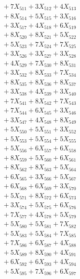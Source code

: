 \documentclass[a4paper,10pt]{article}
\begin{document}
{\begin{align}
&\;  + 7 X_{511} + 3 X_{512} + 4 X_{513} \\[0.3ex]
&\;  + 8 X_{514} + 5 X_{515} + 3 X_{516} \\[0.3ex]
&\;  + 3 X_{517} + 4 X_{518} + 6 X_{519} \\[0.5ex]\allowbreak
&\;  + 8 X_{520} + 8 X_{521} + 5 X_{522} \\[0.3ex]
&\;  + 5 X_{523} + 7 X_{524} + 7 X_{525} \\[0.3ex]
&\;  + 3 X_{526} + 3 X_{527} + 3 X_{528} \\[0.3ex]
&\;  + 4 X_{529} + 7 X_{530} + 8 X_{531} \\[0.3ex]
&\;  + 3 X_{532} + 8 X_{533} + 7 X_{534} \\[0.3ex]
&\;  + 8 X_{535} + 8 X_{536} + 8 X_{537} \\[0.3ex]
&\;  + 3 X_{538} + 4 X_{539} + 3 X_{540} \\[0.3ex]
&\;  + 7 X_{541} + 8 X_{542} + 7 X_{543} \\[0.3ex]
&\;  + 7 X_{544} + 6 X_{545} + 3 X_{546} \\[0.3ex]
&\;  + 3 X_{547} + 4 X_{548} + 8 X_{549} \\[0.5ex]\allowbreak
&\;  + 5 X_{550} + 5 X_{551} + 3 X_{552} \\[0.3ex]
&\;  + 5 X_{553} + 5 X_{554} + 5 X_{555} \\[0.3ex]
&\;  + 5 X_{556} + 6 X_{557} + 6 X_{558} \\[0.3ex]
&\;  + 8 X_{559} + 5 X_{560} + 6 X_{561} \\[0.3ex]
&\;  + 8 X_{562} + 8 X_{563} + 5 X_{564} \\[0.3ex]
&\;  + 6 X_{565} + 3 X_{566} + 5 X_{567} \\[0.3ex]
&\;  + 6 X_{568} + 6 X_{569} + 3 X_{570} \\[0.3ex]
&\;  + 5 X_{571} + 8 X_{572} + 6 X_{573} \\[0.3ex]
&\;  + 3 X_{574} + 5 X_{575} + 6 X_{576} \\[0.3ex]
&\;  + 7 X_{577} + 4 X_{578} + 5 X_{579} \\[0.5ex]\allowbreak
&\;  + 5 X_{580} + 5 X_{581} + 7 X_{582} \\[0.3ex]
&\;  + 5 X_{583} + 5 X_{584} + 7 X_{585} \\[0.3ex]
&\;  + 7 X_{586} + 6 X_{587} + 4 X_{588} \\[0.3ex]
&\;  + 5 X_{589} + 8 X_{590} + 4 X_{591} \\[0.3ex]
&\;  + 6 X_{592} + 6 X_{593} + 4 X_{594} \\[0.3ex]
&\;  + 5 X_{595} + 7 X_{596} + 6 X_{597} \\[0.3ex]

\end{align}}
\end{document}
